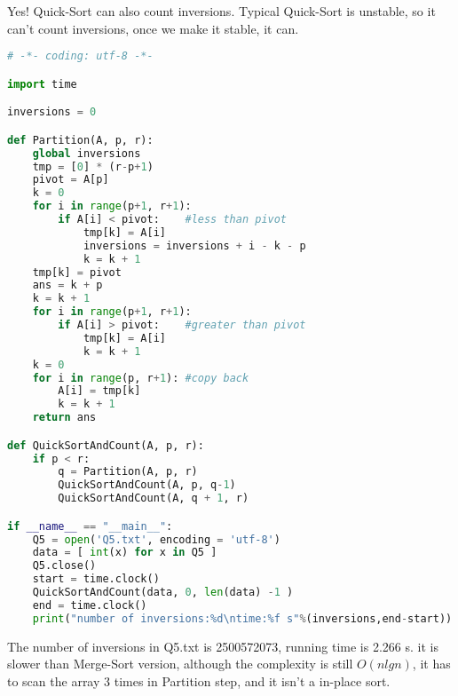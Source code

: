 \documentclass[a4paper,12pt]{article}
\begin{document}
Yes! Quick-Sort can also count inversions. Typical Quick-Sort is unstable, so it can't count inversions, once we make it stable, it can.
\begin{lstlisting}[language=Python]
# -*- coding: utf-8 -*-

import time

inversions = 0

def Partition(A, p, r):
    global inversions
    tmp = [0] * (r-p+1)
    pivot = A[p]
    k = 0
    for i in range(p+1, r+1):
        if A[i] < pivot:	#less than pivot
            tmp[k] = A[i]
            inversions = inversions + i - k - p
            k = k + 1
    tmp[k] = pivot
    ans = k + p
    k = k + 1
    for i in range(p+1, r+1):
        if A[i] > pivot:	#greater than pivot
            tmp[k] = A[i]
            k = k + 1
    k = 0
    for i in range(p, r+1):	#copy back
        A[i] = tmp[k]
        k = k + 1
    return ans

def QuickSortAndCount(A, p, r):
    if p < r:
        q = Partition(A, p, r)
        QuickSortAndCount(A, p, q-1)
        QuickSortAndCount(A, q + 1, r)

if __name__ == "__main__":
    Q5 = open('Q5.txt', encoding = 'utf-8')
    data = [ int(x) for x in Q5 ]
    Q5.close()
    start = time.clock()
    QuickSortAndCount(data, 0, len(data) -1 )
    end = time.clock()
    print("number of inversions:%d\ntime:%f s"%(inversions,end-start))

\end{lstlisting}

The number of inversions in Q5.txt is 2500572073, running time is 2.266 s. it is slower than Merge-Sort version, although the complexity is still $O(nlgn)$, it has to scan the array 3 times in Partition step, and it isn't a in-place sort.
\end{document}
